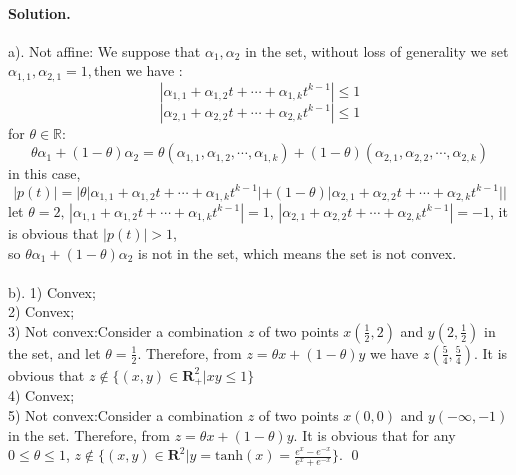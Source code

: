 \documentclass[a4paper]{article}
\newenvironment{solution}
{\color{blue} \paragraph{Solution.}}
{\newline \qed}
\begin{document}
\begin{solution}
    a). Not affine: We suppose that $\alpha_1,\alpha_2$ in the set, without loss of generality we set $\alpha_{1,1}, \alpha_{2,1} = 1,$then we have :
    $$|\alpha_{1,1}+\alpha_{1,2}t+\cdots+\alpha_{1,k}t^{k-1}|\leq 1$$
    $$|\alpha_{2,1}+\alpha_{2,2}t+\cdots+\alpha_{2,k}t^{k-1}|\leq 1$$
    for $\theta \in \mathbb{R}:$ $$\theta \alpha_1+(1-\theta)\alpha_2=\theta(\alpha_{1,1},\alpha_{1,2},\cdots,\alpha_{1,k})+(1-\theta)(\alpha_{2 ,1},\alpha_{2,2},\cdots,\alpha_{2,k})$$ in this case, $$|p(t)|=|\theta |\alpha_{1,1}+\alpha_{1,2}t+\cdots+\alpha_{1,k}t^{k-1}| + (1-\theta)|\alpha_{2,1}+\alpha_{2,2}t+\cdots+\alpha_{2,k}t^{k-1}||$$ let $\theta=2,\, |\alpha_{1,1}+\alpha_{1,2}t+\cdots+\alpha_{1,k}t^{k-1}|=1,\,|\alpha_{2,1}+\alpha_{2,2}t+\cdots+\alpha_{2,k}t^{k-1}|=-1$, it is obvious that $|p(t)|>1$,\\so $\theta \alpha_1+(1-\theta)\alpha_2$ is not in the set, which means the set is not convex. \\
    \\b). 1) Convex;\\2) Convex;\\3) Not convex:\quad Consider a combination $z$ of two points $x (\frac{1}{2},2)$ and $y (2,\frac{1}{2})$ in the set, and let $\theta=\frac{1}{2}$. Therefore, from $z=\theta x + (1-\theta)y$ we have $z(\frac{5}{4},\frac{5}{4})$. It is obvious that $z \not\in \{  (x,y)\in \mathbf{R}^2_{+} | xy \leq 1 \}$\\4) Convex;\\5) Not convex:\quad Consider a combination $z$ of two points $x (0,0)$ and $y (-\infty,-1)$ in the set. Therefore, from $z=\theta x + (1-\theta)y$. It is obvious that for any $0 \leq \theta \leq 1$, $z \not\in \{  (x,y)\in \mathbf{R}^2 | y = \text{tanh}(x) = \frac{e^{x}-e^{-x}}{e^{x}+e^{-x}}\}$.
\end{solution}
\end{document}
